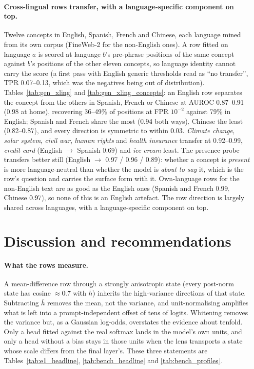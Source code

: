 \documentclass[11pt]{article}
\renewcommand{\hbar}{\bar{h}}
\begin{document}


\paragraph{Cross-lingual rows transfer, with a language-specific component on top.}
Twelve concepts in English, Spanish, French and Chinese, each language mined from its own corpus (FineWeb-2 for the non-English ones). A row fitted on language $a$ is scored at language $b$'s pre-phrase positions of the same concept against $b$'s positions of the other eleven concepts, so language identity cannot carry the score (a first pass with English generic thresholds read as ``no transfer'', TPR 0.07--0.13, which was the negatives being out of distribution). Tables~\ref{tab:gen_xling} and \ref{tab:gen_xling_concepts}: an English row separates the concept from the others in Spanish, French or Chinese at AUROC 0.87--0.91 (0.98 at home), recovering 36--49\% of positions at FPR $10^{-2}$ against 79\% in English; Spanish and French share the most (0.94 both ways), Chinese the least (0.82--0.87), and every direction is symmetric to within 0.03. \emph{Climate change}, \emph{solar system}, \emph{civil war}, \emph{human rights} and \emph{health insurance} transfer at 0.92--0.99, \emph{credit card} (English $\to$ Spanish 0.69) and \emph{ice cream} least. The presence probe transfers better still (English $\to$ 0.97 / 0.96 / 0.89): whether a concept is \emph{present} is more language-neutral than whether the model is \emph{about to say} it, which is the row's question and carries the surface form with it. Own-language rows for the non-English text are as good as the English ones (Spanish and French 0.99, Chinese 0.97), so none of this is an English artefact. The row direction is largely shared across languages, with a language-specific component on top.




\section{Discussion and recommendations}
\label{sec:disc}
\paragraph{What the rows measure.}
A mean-difference row through a strongly anisotropic state (every post-norm state has cosine $\approx0.7$ with $\hbar$) inherits the high-variance directions of that state. Subtracting $\hbar$ removes the mean, not the variance, and unit-normalising amplifies what is left into a prompt-independent offset of tens of logits. Whitening removes the variance but, as a Gaussian log-odds, overstates the evidence about tenfold. Only a head fitted against the real softmax lands in the model's own units, and only a head without a bias stays in those units when the lens transports a state whose scale differs from the final layer's. These three statements are Tables~\ref{tab:e1_headline}, \ref{tab:bench_headline} and \ref{tab:bench_profiles}.
\end{document}
